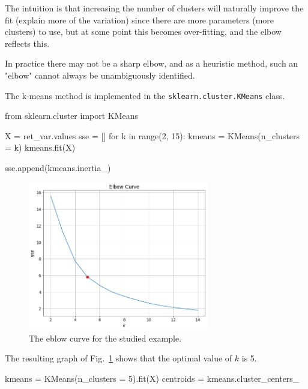The intuition is that increasing the number of clusters will naturally improve the fit (explain more of the variation) since there are more parameters (more clusters) to use, but at some point this becomes over-fitting, and the elbow reflects this. 
 
In practice there may not be a sharp elbow, and as a heuristic method, such an "elbow" cannot always be unambiguously identified.

The k-means method is implemented in the \texttt{sklearn.cluster.KMeans} class.

\begin{ipython} 
from sklearn.cluster import KMeans
 
X =  ret_var.values 
sse = []
for k in range(2, 15):
    kmeans = KMeans(n_clusters = k)
    kmeans.fit(X)
   
    sse.append(kmeans.inertia_) 
\end{ipython}

\begin{figure}
\centering
\includegraphics[width=0.7\textwidth]{figures/elbow_curve}
\caption{The eblow curve for the studied example.}
\label{fig:elbow_curve}
\end{figure}
 
The resulting graph of Fig.~\ref{fig:elbow_curve} shows that the optimal value of $k$ is 5.

\begin{ipython} 
kmeans = KMeans(n_clusters = 5).fit(X)
centroids = kmeans.cluster_centers_
\end{ipython}

